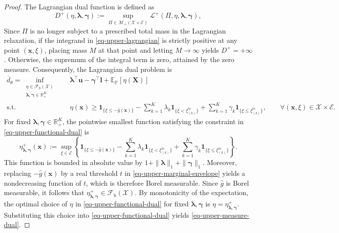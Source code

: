 \documentclass[review,11pt,3p,authoryear,nopreprintline]{elsarticle}
\begin{document}
\begin{proof}
  The Lagrangian dual function is defined as
  \begin{equation}
    D^+(\eta,\bm\lambda,\bm\gamma)
    :=\sup_{\Pi\in\mathcal M_+(\mathcal X\times\mathcal E)}\mathcal L^+(\Pi,\eta,\bm\lambda,\bm\gamma),
    \label{eq-upper-dual-function}
  \end{equation}
  Since $\Pi$ is no longer subject to a prescribed total mass in the Lagrangian relaxation, if the integrand in \eqref{eq-upper-lagrangian} is strictly positive at any point $(\bm x,\xi)$, placing mass $M$ at that point and letting $M\to\infty$ yields $D^+=+\infty$. Otherwise, the supremum of the integral term is zero, attained by the zero measure. Consequently, the Lagrangian dual problem is
  \begin{equation}
    \begin{aligned}
      \overline d_\theta
      =\inf_{\substack{\eta\in\mathcal F_{\mathrm b}(\mathcal X)\\
      \bm\lambda,\bm\gamma\in\mathbb R_+^K}}
      \quad &\bm\lambda^\top\bm u-\bm\gamma^\top\bm l+\mathbb E_{\mathbb P}\left[\eta(\bm X)\right]\\
      \text{s.t.}\quad & \eta(\bm x)\ge
      \mathbf1_{\{\xi\le-\hat g(\bm x)\}}
      -\sum_{k=1}^K\lambda_k\mathbf1_{\{\xi<\xi_{(k)}^{\mathrm{te}}\}} 
      +\sum_{k=1}^K\gamma_k\mathbf1_{\{\xi\le\xi_{(k)}^{\mathrm{te}}\}},
      \qquad\forall(\bm x,\xi)\in\mathcal X\times\mathcal E.
    \end{aligned}
    \label{eq-upper-functional-dual}
  \end{equation}
  For fixed $\bm\lambda,\bm\gamma\in\mathbb R_+^K$, the pointwise smallest function satisfying the constraint in \eqref{eq-upper-functional-dual} is
  \begin{equation}
    \eta^+_{\bm\lambda,\bm\gamma}(\bm x)
    :=\sup_{\xi\in\mathcal E}\left\{
      \mathbf1_{\{\xi\le-\hat g(\bm x)\}}
      -\sum_{k=1}^K\lambda_k\mathbf1_{\{\xi<\xi_{(k)}^{\mathrm{te}}\}}
      +\sum_{k=1}^K\gamma_k\mathbf1_{\{\xi\le\xi_{(k)}^{\mathrm{te}}\}}
    \right\}.
    \label{eq-upper-marginal-envelope}
  \end{equation}
  This function is bounded in absolute value by $1+\|\bm\lambda\|_1+\|\bm\gamma\|_1$. Moreover, replacing $-\hat g(\bm x)$ by a real threshold $t$ in \eqref{eq-upper-marginal-envelope} yields a nondecreasing function of $t$, which is therefore Borel measurable. Since $\hat g$ is Borel measurable, it follows that $\eta^+_{\bm\lambda,\bm\gamma}\in\mathcal F_{\mathrm b}(\mathcal X)$. By monotonicity of the expectation, the optimal choice of $\eta$ in \eqref{eq-upper-functional-dual} for fixed $\bm\lambda,\bm\gamma$ is $\eta=\eta^+_{\bm\lambda,\bm\gamma}$. Substituting this choice into \eqref{eq-upper-functional-dual} yields \eqref{eq-upper-measure-dual}.


\end{proof}
\end{document}
